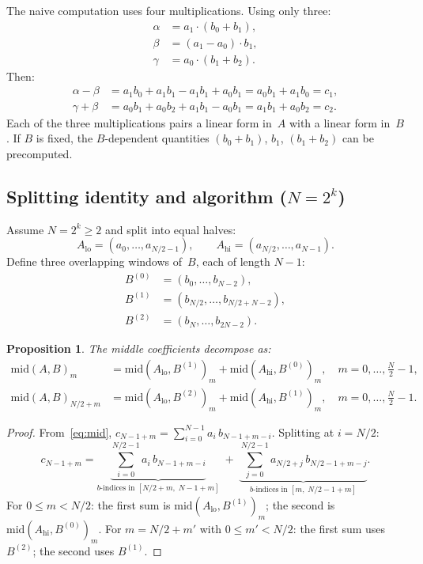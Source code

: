 \documentclass[11pt]{article}
\newcommand{\midd}{\mathrm{mid}}
\theoremstyle{plain}
\newtheorem{proposition}[theorem]{Proposition}
\theoremstyle{remark}
\begin{document}
\medskip\noindent
The naive computation uses four multiplications.
Using only three:
\begin{align*}
\alpha &= a_1 \cdot (b_0 + b_1), \\
\beta &= (a_1 - a_0) \cdot b_1, \\
\gamma &= a_0 \cdot (b_1 + b_2).
\end{align*}
Then:
\begin{align*}
\alpha - \beta &= a_1 b_0 + a_1 b_1 - a_1 b_1 + a_0 b_1
= a_0 b_1 + a_1 b_0 = c_1, \\
\gamma + \beta &= a_0 b_1 + a_0 b_2 + a_1 b_1 - a_0 b_1
= a_1 b_1 + a_0 b_2 = c_2.
\end{align*}
Each of the three multiplications pairs
a linear form in~$A$ with a linear form in~$B$.
If $B$ is fixed, the $B$-dependent quantities
$(b_0 + b_1)$, $b_1$, $(b_1 + b_2)$
can be precomputed.

\subsection{Splitting identity and algorithm ($N = 2^k$)}

Assume $N = 2^k \ge 2$ and split into equal halves:
\[
A_{\mathrm{lo}} = (a_0, \ldots, a_{N/2-1}), \qquad
A_{\mathrm{hi}} = (a_{N/2}, \ldots, a_{N-1}).
\]
Define three overlapping windows of~$B$,
each of length $N{-}1$:
\begin{align*}
B^{(0)} &= (b_0, \ldots, b_{N-2}), \\
B^{(1)} &= (b_{N/2}, \ldots, b_{N/2+N-2}), \\
B^{(2)} &= (b_N, \ldots, b_{2N-2}).
\end{align*}

\begin{proposition}\label{prop:split}
The middle coefficients decompose as:
\begin{align*}
\midd(A, B)_m &=
\midd(A_{\mathrm{lo}}, B^{(1)})_m
+ \midd(A_{\mathrm{hi}}, B^{(0)})_m,
\quad m = 0, \ldots, \tfrac{N}{2}{-}1, \\[3pt]
\midd(A, B)_{N/2+m} &=
\midd(A_{\mathrm{lo}}, B^{(2)})_m
+ \midd(A_{\mathrm{hi}}, B^{(1)})_m,
\quad m = 0, \ldots, \tfrac{N}{2}{-}1.
\end{align*}
\end{proposition}

\begin{proof}
From~\eqref{eq:mid},
$c_{N-1+m} = \sum_{i=0}^{N-1} a_i\, b_{N-1+m-i}$.
Splitting at $i = N/2$:
\[
c_{N-1+m}
= \underbrace{\sum_{i=0}^{N/2-1} a_i\, b_{N-1+m-i}}_{
  \text{$b$-indices in } [N/2{+}m,\; N{-}1{+}m]}
\;+\;
\underbrace{\sum_{j=0}^{N/2-1} a_{N/2+j}\, b_{N/2-1+m-j}}_{
  \text{$b$-indices in } [m,\; N/2{-}1{+}m]}.
\]
For $0 \le m < N/2$:
the first sum is $\midd(A_{\mathrm{lo}}, B^{(1)})_m$;
the second is $\midd(A_{\mathrm{hi}}, B^{(0)})_m$.
For $m = N/2 + m'$ with $0 \le m' < N/2$:
the first sum uses $B^{(2)}$;
the second uses $B^{(1)}$.
\end{proof}
\end{document}
